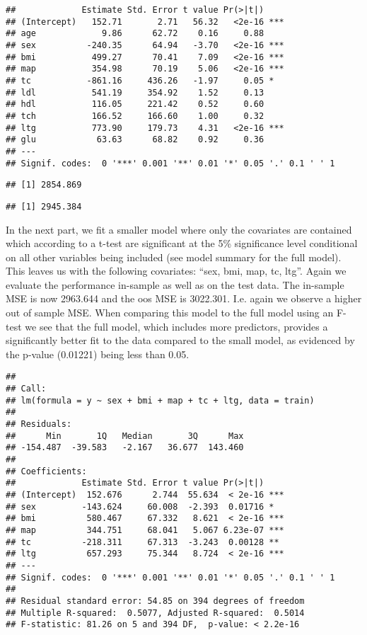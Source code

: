 \documentclass[
]{article}
\begin{document}
\begin{verbatim}
##             Estimate Std. Error t value Pr(>|t|)    
## (Intercept)   152.71       2.71   56.32   <2e-16 ***
## age             9.86      62.72    0.16     0.88    
## sex          -240.35      64.94   -3.70   <2e-16 ***
## bmi           499.27      70.41    7.09   <2e-16 ***
## map           354.98      70.19    5.06   <2e-16 ***
## tc           -861.16     436.26   -1.97     0.05 *  
## ldl           541.19     354.92    1.52     0.13    
## hdl           116.05     221.42    0.52     0.60    
## tch           166.52     166.60    1.00     0.32    
## ltg           773.90     179.73    4.31   <2e-16 ***
## glu            63.63      68.82    0.92     0.36    
## ---
## Signif. codes:  0 '***' 0.001 '**' 0.01 '*' 0.05 '.' 0.1 ' ' 1
\end{verbatim}

\begin{verbatim}
## [1] 2854.869
\end{verbatim}

\begin{verbatim}
## [1] 2945.384
\end{verbatim}

In the next part, we fit a smaller model where only the covariates are
contained which according to a t-test are significant at the 5\%
significance level conditional on all other variables being included
(see model summary for the full model). This leaves us with the
following covariates: ``sex, bmi, map, tc, ltg''. Again we evaluate the
performance in-sample as well as on the test data. The in-sample MSE is
now 2963.644 and the oos MSE is 3022.301. I.e. again we observe a higher
out of sample MSE. When comparing this model to the full model using an
F-test we see that the full model, which includes more predictors,
provides a significantly better fit to the data compared to the small
model, as evidenced by the p-value (0.01221) being less than 0.05.

\begin{verbatim}
## 
## Call:
## lm(formula = y ~ sex + bmi + map + tc + ltg, data = train)
## 
## Residuals:
##      Min       1Q   Median       3Q      Max 
## -154.487  -39.583   -2.167   36.677  143.460 
## 
## Coefficients:
##             Estimate Std. Error t value Pr(>|t|)    
## (Intercept)  152.676      2.744  55.634  < 2e-16 ***
## sex         -143.624     60.008  -2.393  0.01716 *  
## bmi          580.467     67.332   8.621  < 2e-16 ***
## map          344.751     68.041   5.067 6.23e-07 ***
## tc          -218.311     67.313  -3.243  0.00128 ** 
## ltg          657.293     75.344   8.724  < 2e-16 ***
## ---
## Signif. codes:  0 '***' 0.001 '**' 0.01 '*' 0.05 '.' 0.1 ' ' 1
## 
## Residual standard error: 54.85 on 394 degrees of freedom
## Multiple R-squared:  0.5077, Adjusted R-squared:  0.5014 
## F-statistic: 81.26 on 5 and 394 DF,  p-value: < 2.2e-16
\end{verbatim}
\end{document}
